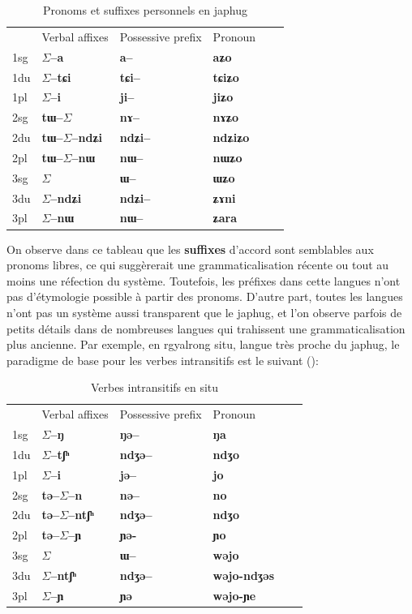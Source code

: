 \documentclass[oldfontcommands,oneside,a4paper,11pt]{memoir}
\newcommand{\ipa}[1]{{\phon\textbf{#1}}}
\newcommand{\sig}{\begin{math}\Sigma\end{math}}
\begin{document}
\begin{table}[H]
\caption{Pronoms et suffixes personnels en japhug}\label{tab:japhug} \centering
\begin{tabular}{llllll} 
	&Verbal affixes &	Possessive prefix &	Pronoun \\
1sg &	\ipa{\sig{}--a} &	\ipa{a–} &	\ipa{aʑo} \\
1du &	\ipa{\sig{}--tɕi} &	\ipa{tɕi–} &	\ipa{tɕiʑo}\\
1pl &	\ipa{\sig{}--i} &	\ipa{ji–} &	\ipa{jiʑo}\\
2sg &	\ipa{tɯ--\sig{}} &	\ipa{nɤ–} &	\ipa{nɤʑo} \\
2du &	\ipa{tɯ--\sig{}--ndʑi} &	\ipa{ndʑi–} &	\ipa{ndʑiʑo} \\
2pl &	\ipa{tɯ--\sig{}--nɯ} &	\ipa{nɯ–} &	\ipa{nɯʑo} \\
3sg &	\sig{}  &	\ipa{ɯ–} &	\ipa{ɯʑo} \\ 
3du &	\sig{}\ipa{--ndʑi} &	\ipa{ndʑi–} &	\ipa{ʑɤni} \\
3pl &	\sig{}\ipa{--nɯ} &	\ipa{nɯ–} &	\ipa{ʑara} \\

\end{tabular}
\end{table}
On observe dans ce tableau que les \textbf{suffixes} d'accord sont semblables aux pronoms libres, ce qui suggèrerait une grammaticalisation récente ou tout au moins une réfection du système. Toutefois, les préfixes dans cette langues n'ont pas d'étymologie possible à partir des pronoms. D'autre part, toutes les langues n'ont pas un système aussi transparent que le japhug, et l'on observe parfois de petits détails dans de nombreuses langues qui trahissent une grammaticalisation plus ancienne. Par exemple, en rgyalrong situ, langue très proche du japhug, le paradigme de base pour les verbes intransitifs est le suivant (\citealt[168, 198]{linxr93jiarong}):
\begin{table}[H]
\caption{Verbes intransitifs en situ }\label{tab:situ1} \centering
\begin{tabular}{llllll} 
	&Verbal affixes &	Possessive prefix &	Pronoun \\
1sg &	\ipa{\sig{}--ŋ} &	\ipa{ŋə–} &	\ipa{ŋa} \\
1du &	\ipa{\sig{}--tʃʰ} &	\ipa{ndʒə–} &	\ipa{ndʒo}\\
1pl &	\ipa{\sig{}--i} &	\ipa{jə–} &	\ipa{jo}\\
2sg &	\ipa{tə--\sig{}--n} &	\ipa{nə–} &	\ipa{no} \\
2du &	\ipa{tə--\sig{}--ntʃʰ} &	\ipa{ndʒə–} &	\ipa{ndʒo} \\
2pl &	\ipa{tə--\sig{}--ɲ} &	\ipa{ɲə-} &	\ipa{ɲo} \\
3sg &	\sig{}  &	\ipa{ɯ–} &	\ipa{wəjo} \\ 
3du &	\sig{}\ipa{--ntʃʰ} &	\ipa{ndʒə–} &	\ipa{wəjo-ndʒəs} \\
3pl &	\sig{}\ipa{--ɲ} &	\ipa{ɲə} &	\ipa{wəjo-ɲe} \\
\end{tabular}
\end{table}
\end{document}
